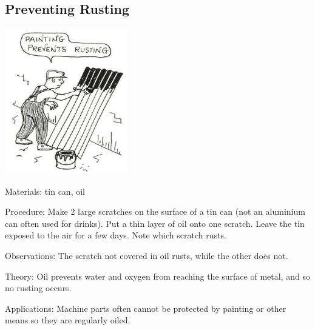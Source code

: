 \begin{multicols}{2}
\subsection{Preventing Rusting} %

\begin{center}
\includegraphics[width=0.4\textwidth]{./img/source/rusting-prevent.jpg}
\end{center}

\begin{description*}
\item[Materials:]{tin can, oil}
\item[Procedure:]{Make 2 large scratches on the surface of a tin can (not an aluminium
can often used for drinks). Put a thin layer of oil onto one scratch.
Leave the tin exposed to the air for a few days. Note which scratch
rusts.}
\item[Observations:]{The scratch not covered in oil rusts, while the other does not.}
\item[Theory:]{Oil prevents water and oxygen from reaching the surface of metal, and so no rusting occurs.}
\item[Applications:]{Machine parts often cannot be protected by painting or other means so they are regularly oiled.}
\end{description*}



\end{multicols}

\pagebreak